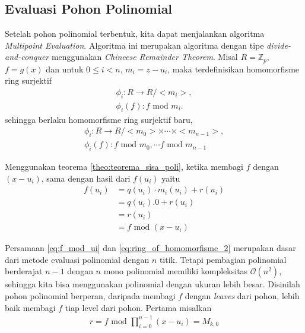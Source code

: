 \subsection{Evaluasi Pohon Polinomial}
\label{sec:evaluasi_pohon_polinomial}
Setelah pohon polinomial terbentuk, kita dapat menjalankan algoritma \textit{Multipoint Evaluation}. Algoritma ini merupakan algoritma dengan tipe \textit{divide-and-conquer} menggunakan \textit{Chineese Remainder Theorem}. Misal $ R  = \mathbb{Z}_p $, $ f = g(x) $ dan untuk $ 0 \leq i < n $, $ m_i = z - u_i $, maka terdefinisikan homomorfisme ring surjektif 
\begin{equation}
	\begin{aligned}
		\phi_i : R \longrightarrow R/<m_i>, \\
		\phi_i(f) : f \text{ mod } m_i.
	\end{aligned}
\end{equation}
sehingga berlaku homomorfisme ring surjektif baru,
\begin{equation}
	\begin{aligned}
		\phi_i : R \longrightarrow R/<m_0> \times \cdots \times <m_{n-1}>, \\
		\phi_i(f) : f \text{ mod } m_0, \cdots f \text{ mod } m_{n-1} 
	\end{aligned}
	\label{eq:ring_of_homomorfisme_2}
\end{equation}

Menggunakan teorema \ref{theo:teorema_sisa_poli}, ketika membagi $ f $ dengan $ (x - u_i ) $, sama dengan hasil dari $ f(u_i) $ yaitu 
\begin{equation}
	\begin{aligned}
		f(u_i) &= q(u_i) \cdot m_i(u_i) + r(u_i) \\
			   &= q(u_i).0 + r(u_i) \\
			   &= r(u_i) \\
			   &= f \text{ mod } (x - u_i)
	\end{aligned}
	\label{eq:f_mod_ui}
\end{equation}

Persamaan \eqref{eq:f_mod_ui} dan \eqref{eq:ring_of_homomorfisme_2} merupakan dasar dari metode evaluasi polinomial dengan $ n $ titik. Tetapi pembagian polinomial berderajat $ n-1 $ dengan $ n $ mono polinomial memiliki kompleksitas $ \mathcal{O}{(n^2)} $, sehingga kita bisa menggunakan polinomial dengan ukuran lebih besar. Disinilah pohon polinomial berperan, daripada membagi $ f $ dengan \textit{leaves} dari pohon, lebih baik membagi $ f $ tiap level dari pohon. Pertama misalkan
\begin{equation}
	\begin{aligned}
		r = f \text{ mod } \prod_{i=0}^{n-1} (x-u_i) = M_{k,0} \\
	\end{aligned}
\end{equation}

